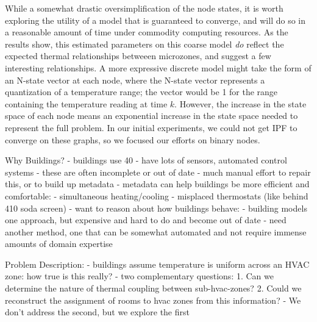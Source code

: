 While a somewhat drastic oversimplification of the node states, it is worth exploring the utility of a model that is guaranteed to converge, and will do so in a reasonable amount of time under commodity computing resources.
As the results show, this estimated parameters on this coarse model \emph{do} reflect the expected thermal relationships betweeen microzones, and suggest a few interesting relationships.
A more expressive discrete model might take the form of an N-state vector at each node, where the N-state vector represents a quantization of a temperature range; the vector would be 1 for the range containing the temperature reading at time $k$.
However, the increase in the state space of each node means an exponential increase in the state space needed to represent the full problem.
In our initial experiments, we could not get IPF to converge on these graphs, so we focused our efforts on binary nodes.



Why Buildings?
- buildings use 40%
    - have lots of sensors, automated control systems
    - these are often incomplete or out of date
    - much manual effort to repair this, or to build up metadata
    - metadata can help buildings be more efficient and comfortable:
        - simultaneous heating/cooling
        - misplaced thermostats (like behind 410 soda screen)
    - want to reason about how buildings behave:
      - building models one approach, but expensive and hard to do and become out of date
      - need another method, one that can be somewhat automated and not require
        immense amounts of domain expertise

Problem Description:
- buildings assume temperature is uniform across an HVAC zone: how true is this really?
    - two complementary questions:
      1. Can we determine the nature of thermal coupling between sub-hvac-zones?
      2. Could we reconstruct the assignment of rooms to hvac zones from this information?
    - We don't address the second, but we explore the first

\fi
